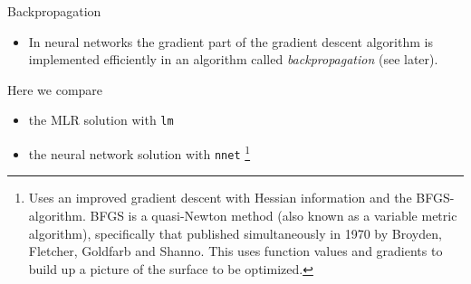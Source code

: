 \documentclass[10pt,ignorenonframetext,]{beamer}
\providecommand{\tightlist}{%
  \setlength{\itemsep}{0pt}\setlength{\parskip}{0pt}}
\begin{document}
\begin{frame}[fragile]

\begin{block}{Backpropagation}

\vspace{2mm}

\begin{itemize}
\tightlist
\item
  In neural networks the gradient part of the gradient descent algorithm
  is implemented efficiently in an algorithm called
  \emph{backpropagation} (see later).
\end{itemize}

\vspace{4mm}

Here we compare

\begin{itemize}
\tightlist
\item
  the MLR solution with \texttt{lm}
\item
  the neural network solution with \texttt{nnet}
  \footnote{Uses an improved gradient descent with Hessian information and the BFGS-algorithm. BFGS is a quasi-Newton method (also known as a variable metric algorithm), specifically that published simultaneously in 1970 by Broyden, Fletcher, Goldfarb and Shanno. This uses function values and gradients to build up a picture of the surface to be optimized.}
\end{itemize}

\end{block}

\end{frame}
\end{document}

